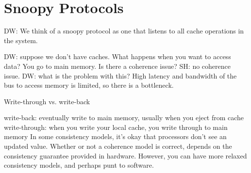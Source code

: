 



\section{Snoopy Protocols}

DW: We think of a snoopy protocol as one that listens to all cache operations in the system.

DW: suppose we don't have caches. What happens when you want to access data? You go to main memory. Is there a coherence issue?
SH: no coherence issue.
DW: what is the problem with this?
High latency and bandwidth of the bus to access memory is limited, so there is a bottleneck.

Write-through vs. write-back

write-back: eventually write to main memory, usually when you eject from cache
write-through: when you write your local cache, you write through to main memory
In some consistency models, it's okay that processors don't see an updated value.
Whether or not a coherence model is correct, depends on the consistency guarantee provided in hardware.
However, you can have more relaxed consistency models, and perhaps punt to software.

